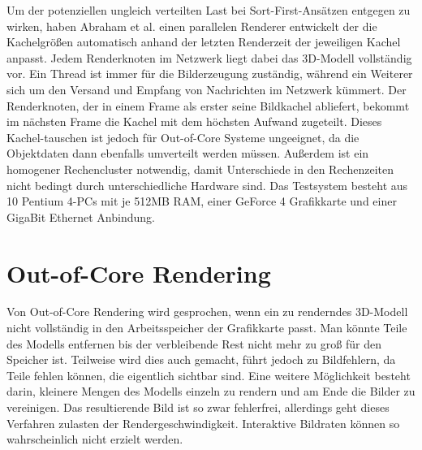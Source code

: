 Um der potenziellen ungleich verteilten Last bei Sort-First-Ansätzen entgegen zu wirken, haben Abraham et al. \cite{abraham} einen parallelen Renderer entwickelt der die Kachelgrößen automatisch anhand der letzten Renderzeit der jeweiligen Kachel anpasst. Jedem Renderknoten im Netzwerk liegt dabei das 3D-Modell vollständig vor. Ein Thread ist immer für die Bilderzeugung zuständig, während ein Weiterer sich um den Versand und Empfang von Nachrichten im Netzwerk kümmert. Der Renderknoten, der in einem Frame als erster seine Bildkachel abliefert, bekommt im nächsten Frame die Kachel mit dem höchsten Aufwand zugeteilt. Dieses Kachel-tauschen ist jedoch für Out-of-Core Systeme ungeeignet, da die Objektdaten dann ebenfalls umverteilt werden müssen. Außerdem ist ein homogener Rechencluster notwendig, damit Unterschiede in den Rechenzeiten nicht bedingt durch unterschiedliche Hardware sind. Das Testsystem besteht aus 10 Pentium 4-PCs mit je 512MB RAM, einer GeForce 4 Grafikkarte und einer GigaBit Ethernet Anbindung.

\section{Out-of-Core Rendering}
\label{sec:relwork:oocrender}
Von Out-of-Core Rendering wird gesprochen, wenn ein zu renderndes 3D-Modell nicht vollständig in den Arbeitsspeicher der Grafikkarte passt. Man könnte Teile des Modells entfernen bis der verbleibende Rest nicht mehr zu groß für den Speicher ist. Teilweise wird dies auch gemacht, führt jedoch zu Bildfehlern, da Teile fehlen können, die eigentlich sichtbar sind. Eine weitere Möglichkeit besteht darin, kleinere Mengen des Modells einzeln zu rendern und am Ende die Bilder zu vereinigen. Das resultierende Bild ist so zwar fehlerfrei, allerdings geht dieses Verfahren zulasten der Rendergeschwindigkeit. Interaktive Bildraten können so wahrscheinlich nicht erzielt werden.

